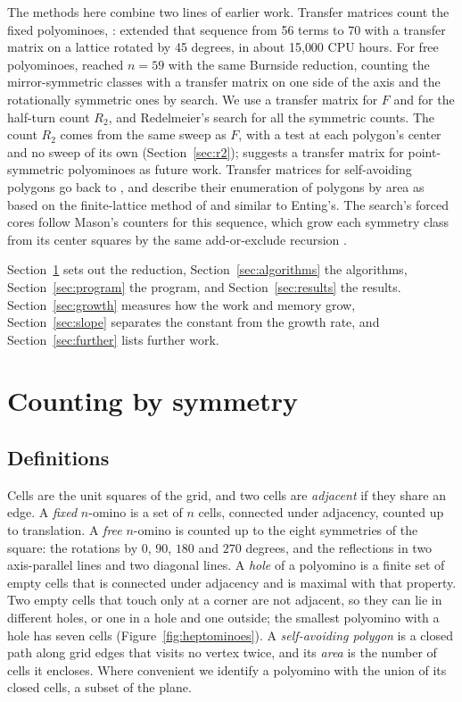 \documentclass[11pt]{a000104}
\numberwithin{equation}{section}
\begin{document}
The methods here combine two lines of earlier work.
Transfer matrices count the fixed polyominoes, : \textcite{BarequetBenShachar:2026} extended that sequence from 56 terms to 70 with a transfer matrix on a lattice rotated by 45 degrees, in about 15{,}000 CPU hours.
For free polyominoes, \textcite{Shirakawa:2025} reached $n = 59$ with the same Burnside reduction, counting the mirror-symmetric classes with a transfer matrix on one side of the axis and the rotationally symmetric ones by search.
We use a transfer matrix for $F$ and for the half-turn count $R_2$, and Redelmeier's search \parencite{Redelmeier:1981} for all the symmetric counts.
The count $R_2$ comes from the same sweep as $F$, with a test at each polygon's center and no sweep of its own (Section~\ref{sec:r2}); \textcite[Sect.~6.1]{Shirakawa:2025} suggests a transfer matrix for point-symmetric polyominoes as future work.
Transfer matrices for self-avoiding polygons go back to \textcite{Enting:1980}, and \textcite{JensenGuttmann:2000} describe their enumeration of polygons by area as based on the finite-lattice method of \textcite{Conway:1995} and similar to Enting's.
The search's forced cores follow Mason's counters for this sequence, which grow each symmetry class from its center squares by the same add-or-exclude recursion \parencite{Mason:2022}.

Section~\ref{sec:symmetry} sets out the reduction, Section~\ref{sec:algorithms} the algorithms, Section~\ref{sec:program} the program, and Section~\ref{sec:results} the results.
Section~\ref{sec:growth} measures how the work and memory grow, Section~\ref{sec:slope} separates the constant from the growth rate, and Section~\ref{sec:further} lists further work.

\section{Counting by symmetry}\label{sec:symmetry}

\subsection{Definitions}

Cells are the unit squares of the grid, and two cells are \emph{adjacent} if they share an edge.
A \emph{fixed} $n$-omino is a set of $n$ cells, connected under adjacency, counted up to translation.
A \emph{free} $n$-omino is counted up to the eight symmetries of the square: the rotations by $0$, $90$, $180$ and $270$ degrees, and the reflections in two axis-parallel lines and two diagonal lines.
A \emph{hole} of a polyomino is a finite set of empty cells that is connected under adjacency and is maximal with that property.
Two empty cells that touch only at a corner are not adjacent, so they can lie in different holes, or one in a hole and one outside; the smallest polyomino with a hole has seven cells (Figure~\ref{fig:heptominoes}).
A \emph{self-avoiding polygon} is a closed path along grid edges that visits no vertex twice, and its \emph{area} is the number of cells it encloses.
Where convenient we identify a polyomino with the union of its closed cells, a subset of the plane.
\end{document}
